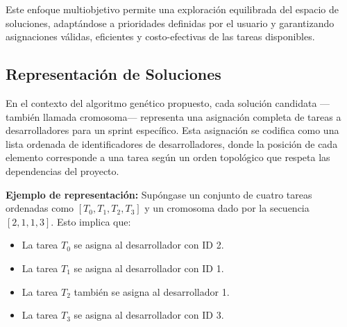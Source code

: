 Este enfoque multiobjetivo permite una exploración equilibrada del espacio de soluciones, adaptándose a prioridades definidas por el usuario y garantizando asignaciones válidas, eficientes y costo-efectivas de las tareas disponibles.





\subsection{Representación de Soluciones}

En el contexto del algoritmo genético propuesto, cada solución candidata —también llamada cromosoma— representa una asignación completa de tareas a desarrolladores para un sprint específico. Esta asignación se codifica como una lista ordenada de identificadores de desarrolladores, donde la posición de cada elemento corresponde a una tarea según un orden topológico que respeta las dependencias del proyecto.

\textbf{Ejemplo de representación:}
Supóngase un conjunto de cuatro tareas ordenadas como $[T_0, T_1, T_2, T_3]$ y un cromosoma dado por la secuencia $[2, 1, 1, 3]$. Esto implica que:
\begin{itemize}
    \item La tarea $T_0$ se asigna al desarrollador con ID 2.
    \item La tarea $T_1$ se asigna al desarrollador con ID 1.
    \item La tarea $T_2$ también se asigna al desarrollador 1.
    \item La tarea $T_3$ se asigna al desarrollador con ID 3.
\end{itemize}

